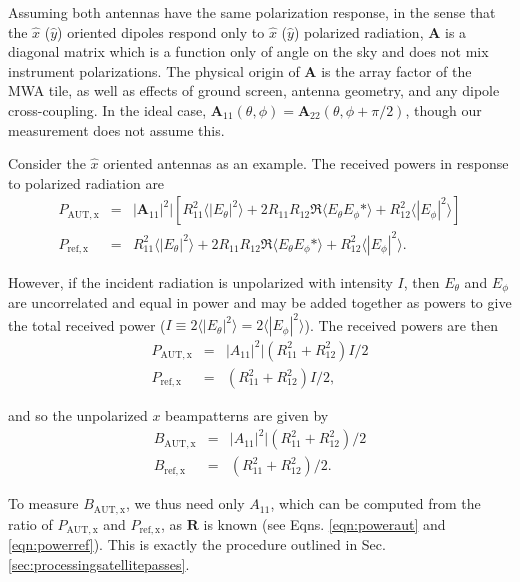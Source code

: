 \begin{subappendices}
Assuming both antennas have the same polarization response, in the sense that the $\hat{x}$ ($\hat{y}$) oriented dipoles respond only to $\hat{x}$ ($\hat{y}$) polarized radiation, $\textbf{A}$ is a diagonal matrix which is a function only of angle on the sky and does not mix instrument polarizations. The physical origin of $\textbf{A}$ is the array factor of the MWA tile, as well as effects of ground screen, antenna geometry, and any dipole cross-coupling. In the ideal case, $\textbf{A}_{11}(\theta,\phi)=\textbf{A}_{22}(\theta,\phi+\pi/2)$, though our measurement does not assume this.

Consider the $\hat{x}$ oriented antennas as an example. The received powers in response to polarized radiation are
\begin{eqnarray}
P_\mathrm{AUT,x}&=& |\textbf{A}_{11}|^2|[R_{11}^2\langle|E_\theta|^2\rangle+2R_{11}R_{12}\Re\langle E_\theta E_\phi*\rangle +R_{12}^2\langle|E_\phi|^2\rangle]\label{eqn:poweraut} \\
P_\mathrm{ref,x}&=&R_{11}^2\langle|E_\theta|^2\rangle+2R_{11}R_{12}\Re\langle E_\theta E_\phi*\rangle+R_{12}^2\langle|E_\phi|^2\rangle.\label{eqn:powerref}
\end{eqnarray}


However, if the incident radiation is unpolarized with intensity $I$, then $E_\theta$ and $E_\phi$ are uncorrelated and equal in power and may be added together as powers to give the total received power ($I\equiv2\langle|E_\theta|^2\rangle=2\langle|E_\phi|^2\rangle$). The received powers are then
 \begin{eqnarray}
P_\mathrm{AUT,x}&=& |A_{11}|^2|(R_{11}^2+R_{12}^2)I/2 \\
P_\mathrm{ref,x}&=&(R_{11}^2+R_{12}^2)I/2,
\end{eqnarray}

and so the unpolarized $x$ beampatterns are given by
\begin{eqnarray}
B_\mathrm{AUT,x}&=& |A_{11}|^2|(R_{11}^2+R_{12}^2)/2\label{eqn:autbeam} \\
B_\mathrm{ref,x}&=&(R_{11}^2+R_{12}^2)/2\label{eqn:refbeam}.
\end{eqnarray}

To measure $B_\mathrm{AUT,x}$, we thus need only $A_{11}$, which can be computed from the ratio of $P_\mathrm{AUT,x}$ and $P_\mathrm{ref,x}$, as $\textbf{R}$ is known (see Eqns. \ref{eqn:poweraut} and \ref{eqn:powerref}). This is exactly the procedure outlined in Sec. \ref{sec:processingsatellitepasses}.  


\end{subappendices}
